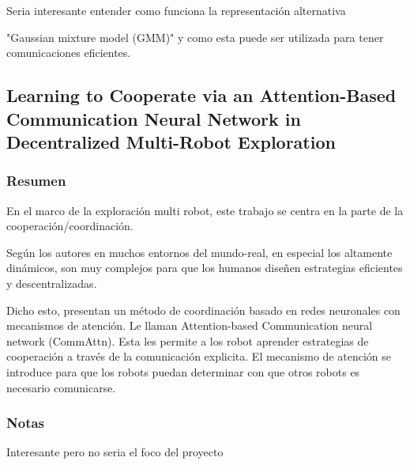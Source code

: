 Seria interesante entender como funciona la representación alternativa

"Gaussian mixture model (GMM)" y como esta puede ser utilizada para tener comunicaciones eficientes.

\subsection{Learning to Cooperate via an Attention-Based Communication Neural Network in Decentralized Multi-Robot Exploration}

\subsubsection{Resumen}
En el marco de la exploración multi robot, este trabajo se centra en la parte de la cooperación/coordinación. 

Según los autores en muchos entornos del mundo-real, en especial los altamente dinámicos, son muy complejos para que los humanos diseñen estrategias eficientes y descentralizadas.

Dicho esto, presentan un método de coordinación basado en redes neuronales con mecanismos de atención. Le llaman Attention-based Communication neural network (CommAttn). Esta les permite a los robot aprender estrategias de cooperación a través de la comunicación explicita. El mecanismo de atención se introduce para que los robots puedan determinar con que otros robots es necesario comunicarse.

\subsubsection{Notas}
Interesante pero no seria el foco del proyecto

